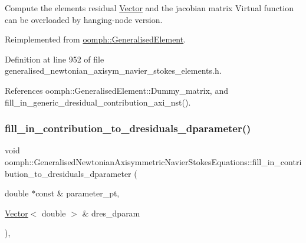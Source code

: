 Compute the element\textquotesingle{}s residual \hyperlink{classoomph_1_1Vector}{Vector} and the jacobian matrix Virtual function can be overloaded by hanging-\/node version. 



Reimplemented from \hyperlink{classoomph_1_1GeneralisedElement_a90ee6ee39dd3950f625148d960f1ba67}{oomph\+::\+Generalised\+Element}.



Definition at line 952 of file generalised\+\_\+newtonian\+\_\+axisym\+\_\+navier\+\_\+stokes\+\_\+elements.\+h.



References oomph\+::\+Generalised\+Element\+::\+Dummy\+\_\+matrix, and fill\+\_\+in\+\_\+generic\+\_\+dresidual\+\_\+contribution\+\_\+axi\+\_\+nst().

\mbox{\label{classoomph_1_1GeneralisedNewtonianAxisymmetricNavierStokesEquations_a863e502006b214a160e50868b803ffa9}} 
\subsubsection{\texorpdfstring{fill\+\_\+in\+\_\+contribution\+\_\+to\+\_\+dresiduals\+\_\+dparameter()}{fill\_in\_contribution\_to\_dresiduals\_dparameter()}}
{\footnotesize\ttfamily void oomph\+::\+Generalised\+Newtonian\+Axisymmetric\+Navier\+Stokes\+Equations\+::fill\+\_\+in\+\_\+contribution\+\_\+to\+\_\+dresiduals\+\_\+dparameter (\begin{DoxyParamCaption}\item[{double $\ast$const \&}]{parameter\+\_\+pt,  }\item[{\hyperlink{classoomph_1_1Vector}{Vector}$<$ double $>$ \&}]{dres\+\_\+dparam }\end{DoxyParamCaption})\hspace{0.3cm}{\ttfamily [inline]}, {\ttfamily [virtual]}}



